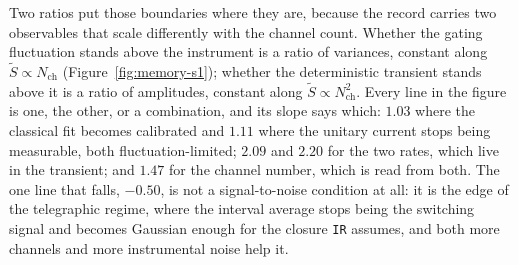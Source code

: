 Two ratios put those boundaries where they are, because the record carries two observables that
scale differently with the channel count. Whether the gating fluctuation stands above the
instrument is a ratio of variances, constant along $\widetilde{S} \propto N_{\mathrm{ch}}$
(Figure~\ref{fig:memory-s1}); whether the deterministic transient stands above
it is a ratio of amplitudes, constant along $\widetilde{S} \propto N_{\mathrm{ch}}^{2}$. Every
line in the figure is one, the other, or a combination, and its slope says which: $1.03$ where
the classical fit becomes calibrated and $1.11$ where the unitary current stops being
measurable, both fluctuation-limited;
$2.09$ and $2.20$ for the two rates, which live in the
transient; and $1.47$ for the channel number, which is read from both. %
The one line that falls,
$-0.50$, is not a signal-to-noise condition at all: it is the edge of the telegraphic regime, where
the interval average stops being the switching signal and becomes Gaussian enough for the closure
\texttt{IR} assumes, and both more channels and more instrumental noise help it.
